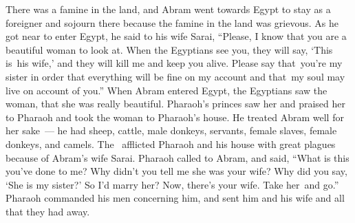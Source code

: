 \begin{inparaenum}
   There was a famine in the land, and Abram went towards Egypt to stay as a foreigner and sojourn there because the famine in the land was grievous.%
   As he got near to enter Egypt, he said to his wife Sarai, ``Please, I know that you are a beautiful woman to look at.%
   When the Egyptians see you, they will say, `This is\understood\ his wife,' and they will kill me and keep you alive.%
   Please say that\understood\ you're my sister in order that everything will be fine on my account and that\understood\ my soul may live on account of you.''%
   When Abram entered Egypt, the Egyptians saw the woman, that she was really beautiful.%
   Pharaoh's princes saw her and praised her to Pharaoh and took the woman to Pharaoh's house.%
   He treated Abram well for her sake~--- he had sheep, cattle, male donkeys, servants, female slaves, female donkeys, and camels.%
   The \lord\ afflicted Pharaoh and his house with great plagues because of Abram's wife Sarai.%
   Pharaoh called to Abram, and said, ``What is this you've done to me? Why didn't you tell me she was your wife?%
   Why did you say, `She is my sister?' So I'd marry her? Now, there's your wife. Take her\understood\ and go.''%
   Pharaoh commanded his men concerning him, and sent him and his wife and all that they had away.%
\end{inparaenum}
